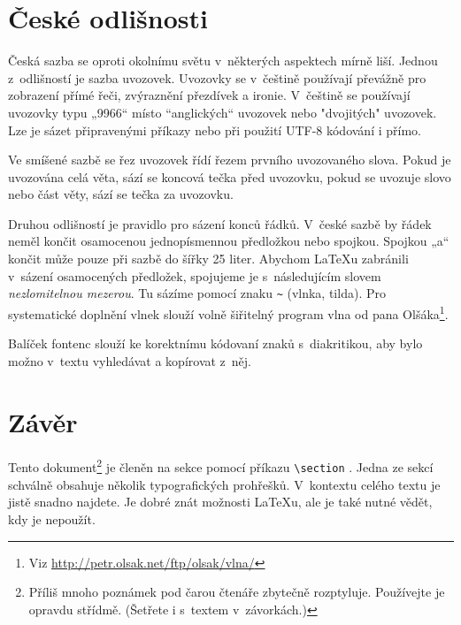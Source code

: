 \documentclass[10 pt, twocolumn]{article}
\begin{document}
\section{České odlišnosti}

Česká sazba se oproti okolnímu světu v~některých aspektech mírně liší. Jednou z~odlišností je sazba uvozovek. Uvozovky se v~češtině používají převážně pro zobrazení přímé řeči, zvýraznění přezdívek a ironie. V~češtině se používají uvozovky typu „9966“ místo ``anglických`` uvozovek nebo "dvojitých" uvozovek. Lze je sázet připravenými příkazy nebo při použití UTF-8 kódování i přímo.

Ve smíšené sazbě se řez uvozovek řídí řezem prvního uvozovaného slova. Pokud je uvozována celá věta, sází se koncová tečka před uvozovku, pokud se uvozuje slovo nebo část věty, sází se tečka za uvozovku.

Druhou odlišností je pravidlo pro sázení konců řádků. V~české sazbě by řádek neměl končit osamocenou jednopísmennou předložkou nebo spojkou. Spojkou „a“ končit může pouze při sazbě do šířky 25 liter. Abychom \LaTeX u zabránili v~sázení osamocených předložek, spojujeme je s~následujícím slovem \textit{nezlomitelnou mezerou}. Tu sázíme pomocí znaku \verb!~! (vlnka, tilda). Pro systematické doplnění vlnek slouží volně šiřitelný program vlna od pana Olšáka\footnote[1]{Viz \url{http://petr.olsak.net/ftp/olsak/vlna/}}.

Balíček fontenc slouží ke korektnímu kódovaní znaků s~diakritikou, aby bylo možno v~textu vyhledávat a kopírovat z~něj.

\section{Závěr}

Tento dokument\footnote[2]{Příliš mnoho poznámek pod čarou čtenáře zbytečně rozptyluje. Používejte je opravdu střídmě. (Šetřete i s~textem v~závorkách.)} je členěn na sekce pomocí příkazu
\verb!\section!
. Jedna ze sekcí schválně obsahuje několik typografických prohřešků. V~kontextu celého textu je jistě snadno najdete. Je dobré znát možnosti \LaTeX u, ale je také nutné vědět, kdy je nepoužít.
\end{document}

